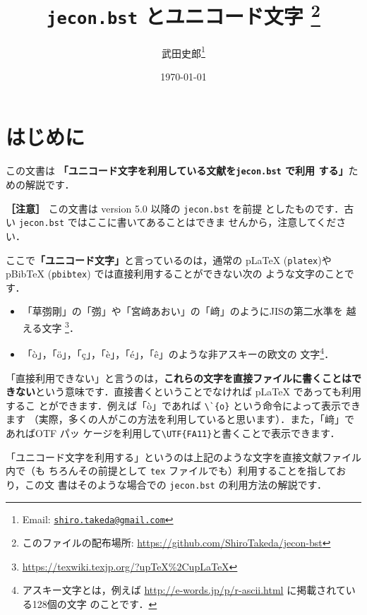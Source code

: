 \documentclass{ltjsarticle}
\title{\textbf{\texttt{jecon.bst} とユニコード文字}
\thanks{このファイルの配布場所: \url{https://github.com/ShiroTakeda/jecon-bst}}
}
\author{武田史郎\thanks{Email:
\texttt{\href{mailto:shiro.takeda@gmail.com}{shiro.takeda@gmail.com}}}}
\date{\today}
\begin{document}
\maketitle

\tableofcontents


\vspace*{1em}

\section{はじめに}

この文書は \textbf{「ユニコード文字を利用している文献を\texttt{jecon.bst} で利用
する」}ための解説です．
\\
\vspace*{1em}

\noindent \textbf{［注意］} この文書は version 5.0 以降の \texttt{jecon.bst} を前提
としたものです．古い \texttt{jecon.bst} ではここに書いてあることはできま
せんから，注意してください．

\vspace*{1em}

ここで\textbf{「ユニコード文字」}と言っているのは，通常の pLaTeX
(\texttt{platex})やpBibTeX (\texttt{pbibtex}) では直接利用することができない次の
ような文字のことです．
\begin{itemize}
 \item 「草彅剛」の「彅」や「宮﨑あおい」の「﨑」のようにJISの第二水準を
       越える文字
       \footnote{\url{https://texwiki.texjp.org/?upTeX\%2CupLaTeX}}．
 \item 「ò」，「ö」，「ç」，「è」，「é」，「ê」のような非アスキーの欧文の
       文字\footnote{アスキー文字とは，例えば
       \url{http://e-words.jp/p/r-ascii.html} に掲載されている128個の文字
       のことです．}．
\end{itemize}

「直接利用できない」と言うのは，\textbf{これらの文字を直接ファイルに書くことはで
きない}という意味です．直接書くということでなければ pLaTeX であっても利用するこ
とができます．例えば「ò」であれば \verb|\`{o}| という命令によって表示できます
（実際，多くの人がこの方法を利用していると思います）．また，「﨑」であればOTF パッ
ケージを利用して\verb|\UTF{FA11}|と書くことで表示できます．

「ユニコード文字を利用する」というのは上記のような文字を直接文献ファイル内で（も
ちろんその前提として \texttt{tex} ファイルでも）利用することを指しており，この文
書はそのような場合での \texttt{jecon.bst} の利用方法の解説です．
\end{document}
